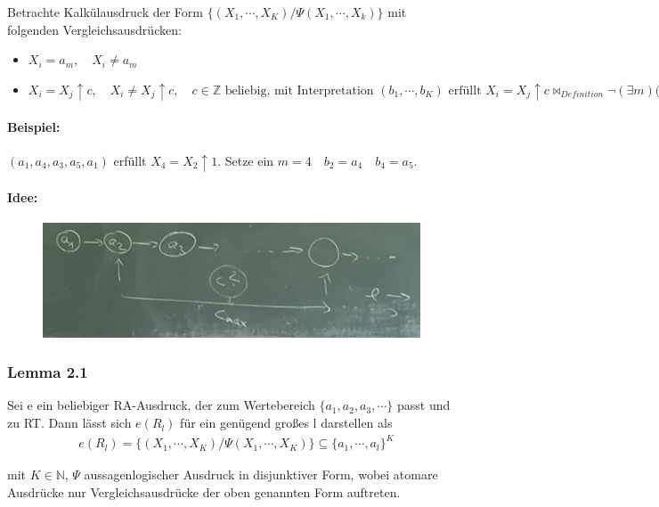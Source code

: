 \documentclass[12pt, a4paper]{article}
\begin{document}
Betrachte Kalkülausdruck der Form $\{ (X_1, \cdots, X_K) / \Psi(X_1, \cdots, X_k) \}$ mit folgenden Vergleichsausdrücken:
\begin{itemize}
\item $X_i = a_m,\quad X_i \neq a_m$
\item $X_i = X_j \uparrow c,\quad X_i \neq X_j \uparrow c, \quad c \in \mathbb{Z} \text{ beliebig, mit Interpretation } (b_1, \cdots, b_K) \text{ erfüllt } X_i = X_j \uparrow c \bowtie_{Definition} \lnot(\exists m)(b_j = a_m \wedge b_i = a_{m+c}$
\end{itemize}

\paragraph{Beispiel:} $(a_1, a_4, a_3, a_5, a_1)$ erfüllt $X_4 = X_2 \uparrow 1$. Setze ein $m=4 \quad b_2 = a_4 \quad b_4 = a_5$.

\paragraph{Idee:}
\begin{figure}
\centering
\includegraphics[width=0.7\linewidth]{img/img18}
\caption{}
\label{fig:img18}
\end{figure}

\subsubsection*{Lemma 2.1} 
Sei e ein beliebiger RA-Ausdruck, der zum Wertebereich $\{ a_1, a_2, a_3, \cdots \}$ passt und zu RT. Dann lässt sich $e(R_l)$ für ein genügend großes l darstellen als
\begin{align*}
&e(R_l) = \{ (X_1, \cdots, X_K) / \Psi(X_1, \cdots, X_K) \} \subseteq \{ a_1, \cdots, a_l \}^K
\end{align*}

mit $K \in \mathbb{N}$, $\Psi$ aussagenlogischer Ausdruck in disjunktiver Form, wobei atomare Ausdrücke nur Vergleichsausdrücke der oben genannten Form auftreten.
\end{document}
